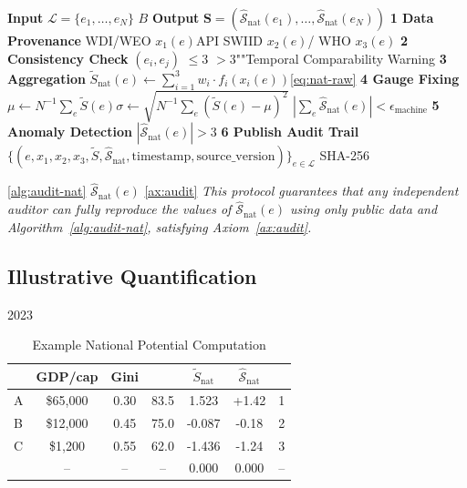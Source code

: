 \documentclass[11pt,a4paper]{article}
\theoremstyle{definition}
\newcommand{\Sopnat}{\hat{\mathcal{S}}_{\text{nat}}}
\begin{document}
\medskip
\begin{algorithm}[htbp]
\caption{ $\mathcal{A}_{\text{nat}}$}
\label{alg:audit-nat}
\begin{algorithmic}[1]
\State \textbf{ Input} $\mathcal{L} = \{e_1, \ldots, e_N\}$ $B$
\State \textbf{ Output} $\mathbf{S} = (\Sopnat(e_1), \ldots, \Sopnat(e_N))$ 
\State \textbf{ 1  Data Provenance}
        \State WDI/WEO $x_1(e)$API
        \State SWIID $x_2(e)$/
        \State WHO $x_3(e)$
    \EndFor
\State \textbf{ 2  Consistency Check}
    \State  $(e_i, e_j)$ $\leq 3$ 
    \State  $> 3$""Temporal Comparability Warning
\State \textbf{ 3  Aggregation}
    \State  $\tilde{S}_{\text{nat}}(e) \leftarrow \sum_{i=1}^3 w_i \cdot f_i(x_i(e))$\ref{eq:nat-raw}
\State \textbf{ 4  Gauge Fixing}
    \State $\mu \leftarrow N^{-1}\sum_e \tilde{S}(e)$$\sigma \leftarrow \sqrt{N^{-1}\sum_e (\tilde{S}(e) - \mu)^2}$
    \State  $\left|\sum_e \Sopnat(e)\right| < \epsilon_{\text{machine}}$
\State \textbf{ 5  Anomaly Detection}
    \State  $|\Sopnat(e)| > 3$ 
\State \textbf{ 6  Publish Audit Trail}
    \State $\{(e, x_1, x_2, x_3, \tilde{S}, \Sopnat, \text{timestamp}, \text{source\_version})\}_{e \in \mathcal{L}}$
    \State SHA-256
\end{algorithmic}
\end{algorithm}

\noindent \ref{alg:audit-nat}
$\Sopnat(e)$ \ref{ax:audit}
\textit{This protocol guarantees that any independent auditor can fully reproduce the values of $\Sopnat(e)$ using only public data and Algorithm~\ref{alg:audit-nat}, satisfying Axiom~\ref{ax:audit}.}

\subsection{ Illustrative Quantification}

2023

\begin{table}[htbp]
\centering
\caption{ Example National Potential Computation}
\label{tab:nat-example}
\begin{tabular}{@{}lcccccc@{}}
\toprule
\textbf{} & GDP/cap & Gini &  & $\tilde{S}_{\text{nat}}$ & $\Sopnat$ &  \\
\midrule
 A & \$65,000 & 0.30 & 83.5 & 1.523 & +1.42 & 1 \\
 B & \$12,000 & 0.45 & 75.0 & -0.087 & -0.18 & 2 \\
 C & \$1,200 & 0.55 & 62.0 & -1.436 & -1.24 & 3 \\
\midrule
 & -- & -- & -- & 0.000 & 0.000 & -- \\
\bottomrule
\end{tabular}
\end{table}
\end{document}
